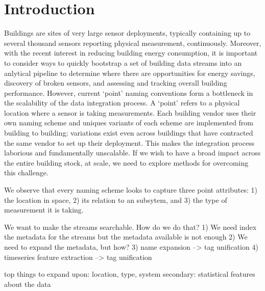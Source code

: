 \section{Introduction}

Buildings are sites of very large sensor deployments, typically containing
up to several thousand sensors reporting physical measurement, continuously.
Moreover, with the recent interest in reducing building energy consumption, it
is important to consider ways to quickly bootstrap a set of building data streams
into an anlytical pipeline to determine where there are opportunities for energy savings,
discovery of broken sensors, and assessing and tracking overall building performance.
However, current `point' naming conventions form a bottleneck in the scalability of
the data integration process.  A `point' refers to a physical location where
a sensor is taking measurements. Each building vendor uses their own naming scheme and
uniques variants of each scheme are implemented from building to building; variations exist
even across buildings that have contracted the same vendor to set up their deployment.
This makes the integration process laborious and fundamentally unscalable.  If we
wish to have a broad impact across the entire building stock, at scale, we need
to explore methods for overcoming this challenge.

We observe that every naming scheme looks to capture three point attributes: 
1) the location in space, 2) its relation to an subsytem, and 3) the type of 
measurement it is taking.  

We want to make the streams searchable.  How do we do that?
1) We need index the metadata for the streams but the metadata available is not enough
2) We need to expand the metadata, but how?
3) name expansion --> tag unification
4) timeseries feature extraction --> tag unification

top things to expand upon:  location, type, system
secondary: statistical features about the data
 
